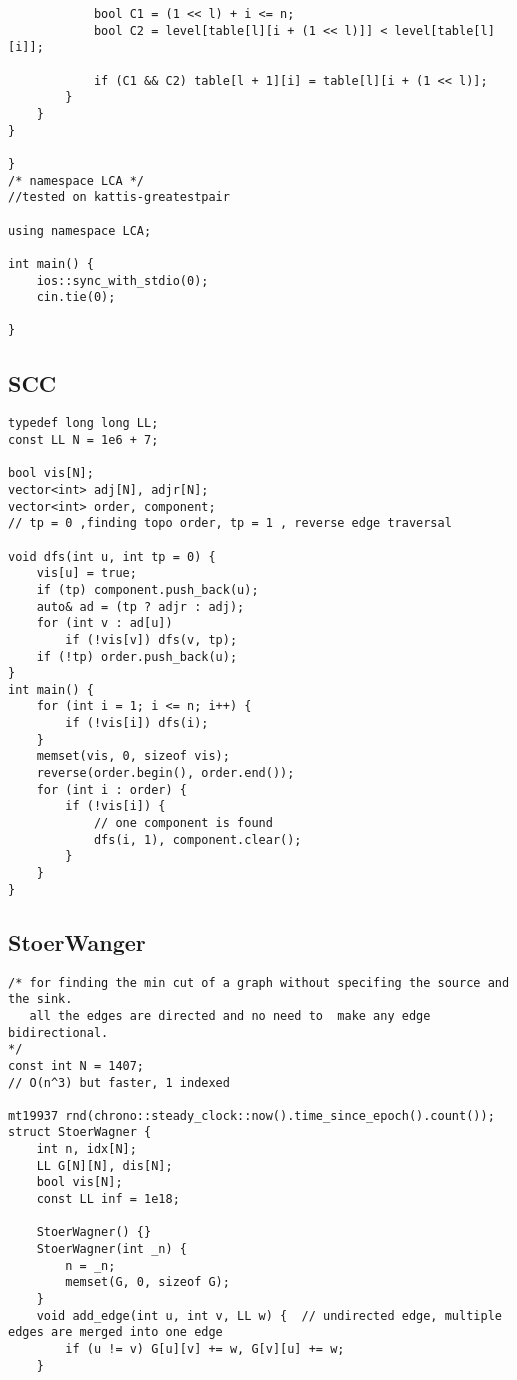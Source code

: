 \documentclass[FSZ,a4paper,onesided]{article}
\begin{document}
\begin{multicols*}{\COLS}
\begin{lstlisting}
            bool C1 = (1 << l) + i <= n;
            bool C2 = level[table[l][i + (1 << l)]] < level[table[l][i]];

            if (C1 && C2) table[l + 1][i] = table[l][i + (1 << l)];
        }
    }
}

} 
/* namespace LCA */
//tested on kattis-greatestpair

using namespace LCA;

int main() {
    ios::sync_with_stdio(0);
    cin.tie(0);

}
\end{lstlisting}
\subsection{SCC}
\begin{lstlisting}
typedef long long LL;
const LL N = 1e6 + 7;

bool vis[N];
vector<int> adj[N], adjr[N];
vector<int> order, component;
// tp = 0 ,finding topo order, tp = 1 , reverse edge traversal

void dfs(int u, int tp = 0) {
    vis[u] = true;
    if (tp) component.push_back(u);
    auto& ad = (tp ? adjr : adj);
    for (int v : ad[u])
        if (!vis[v]) dfs(v, tp);
    if (!tp) order.push_back(u);
}
int main() {
    for (int i = 1; i <= n; i++) {
        if (!vis[i]) dfs(i);
    }
    memset(vis, 0, sizeof vis);
    reverse(order.begin(), order.end());
    for (int i : order) {
        if (!vis[i]) {
            // one component is found
            dfs(i, 1), component.clear();
        }
    }
}

\end{lstlisting}
\subsection{StoerWanger}
\begin{lstlisting}
/* for finding the min cut of a graph without specifing the source and  the sink.
   all the edges are directed and no need to  make any edge bidirectional.
*/
const int N = 1407;
// O(n^3) but faster, 1 indexed

mt19937 rnd(chrono::steady_clock::now().time_since_epoch().count());
struct StoerWagner {
    int n, idx[N];
    LL G[N][N], dis[N];
    bool vis[N];
    const LL inf = 1e18;

    StoerWagner() {}
    StoerWagner(int _n) {
        n = _n;
        memset(G, 0, sizeof G);
    }
    void add_edge(int u, int v, LL w) {  // undirected edge, multiple edges are merged into one edge
        if (u != v) G[u][v] += w, G[v][u] += w;
    }


\end{lstlisting}
\end{multicols*}
\end{document}
